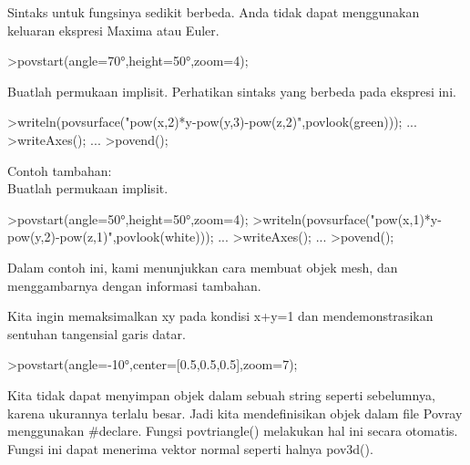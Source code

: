 \documentclass[12pt,arial,letterpaper]{book}
\begin{document}
\begin{eulercomment}
\begin{eulercomment}
\begin{eulercomment}
\begin{eulercomment}
\begin{eulercomment}
\begin{eulercomment}
\begin{eulercomment}
\begin{eulercomment}
\begin{eulercomment}
\begin{eulercomment}
\begin{eulercomment}
\begin{eulercomment}
\begin{eulercomment}
\begin{eulercomment}
\begin{eulercomment}
\begin{eulercomment}
\begin{eulercomment}
\begin{eulercomment}
\begin{eulercomment}
Sintaks untuk fungsinya sedikit berbeda. Anda tidak dapat menggunakan
keluaran ekspresi Maxima atau Euler.
\end{eulercomment}
\begin{eulerprompt}
>povstart(angle=70°,height=50°,zoom=4);
\end{eulerprompt}
\begin{eulercomment}
Buatlah permukaan implisit. Perhatikan sintaks yang berbeda pada
ekspresi ini.
\end{eulercomment}
\begin{eulerprompt}
>writeln(povsurface("pow(x,2)*y-pow(y,3)-pow(z,2)",povlook(green))); ...
>writeAxes(); ...
>povend();
\end{eulerprompt}
\begin{eulercomment}
Contoh tambahan:\\
Buatlah permukaan implisit.
\end{eulercomment}
\begin{eulerprompt}
>povstart(angle=50°,height=50°,zoom=4);
>writeln(povsurface("pow(x,1)*y-pow(y,2)-pow(z,1)",povlook(white))); ...
>writeAxes(); ...
>povend();
\end{eulerprompt}
\begin{eulercomment}
Dalam contoh ini, kami menunjukkan cara membuat objek mesh, dan
menggambarnya dengan informasi tambahan.

Kita ingin memaksimalkan xy pada kondisi x+y=1 dan mendemonstrasikan
sentuhan tangensial garis datar.
\end{eulercomment}
\begin{eulerprompt}
>povstart(angle=-10°,center=[0.5,0.5,0.5],zoom=7);
\end{eulerprompt}
\begin{eulercomment}
Kita tidak dapat menyimpan objek dalam sebuah string seperti
sebelumnya, karena ukurannya terlalu besar. Jadi kita mendefinisikan
objek dalam file Povray menggunakan #declare. Fungsi povtriangle()
melakukan hal ini secara otomatis. Fungsi ini dapat menerima vektor
normal seperti halnya pov3d().


\end{eulercomment}
\end{eulercomment}
\end{eulercomment}
\end{eulercomment}
\end{eulercomment}
\end{eulercomment}
\end{eulercomment}
\end{eulercomment}
\end{eulercomment}
\end{eulercomment}
\end{eulercomment}
\end{eulercomment}
\end{eulercomment}
\end{eulercomment}
\end{eulercomment}
\end{eulercomment}
\end{eulercomment}
\end{eulercomment}
\end{eulercomment}
\end{document}
